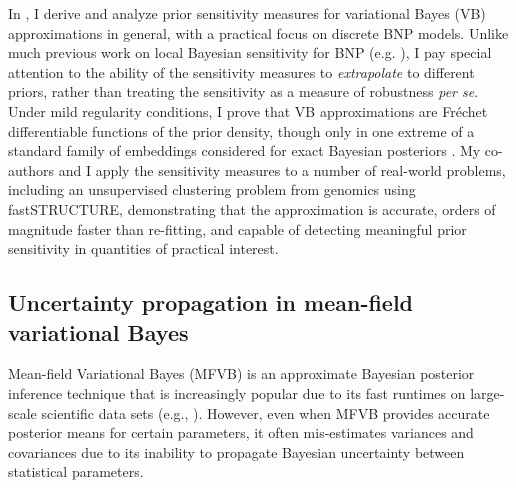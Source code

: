 In \citet{giordano:2021:bnpsensitivity}, I derive and analyze prior sensitivity
measures for variational Bayes (VB) approximations in general, with a practical
focus on discrete BNP models. Unlike much previous work on local Bayesian
sensitivity for BNP (e.g. \citet{Basu:2000:BNP_robustness}), I pay special
attention to the ability of the sensitivity measures to \emph{extrapolate} to
different priors, rather than treating the sensitivity as a measure of
robustness \textit{per se}. Under mild regularity conditions, I prove that VB
approximations are Fr{\'e}chet differentiable functions of the prior density,
though only in one extreme of a standard family of embeddings considered for
exact Bayesian posteriors \citep{gustafson:1996:localposterior}.
My co-authors and I apply the sensitivity measures to a number of real-world
problems, including an unsupervised clustering problem from genomics using
fastSTRUCTURE, demonstrating that the approximation is accurate, orders of
magnitude faster than re-fitting, and capable of detecting meaningful prior
sensitivity in quantities of practical interest.


\subsection{Uncertainty propagation in mean-field variational Bayes}
%
Mean-field Variational Bayes (MFVB) is an approximate Bayesian posterior
inference technique that is increasingly popular due to its fast runtimes on
large-scale scientific data sets (e.g., \citet{regier:2019:cataloging}).
However, even when MFVB provides accurate posterior means for certain
parameters, it often mis-estimates variances and covariances due to its
inability to propagate Bayesian uncertainty between statistical parameters.



